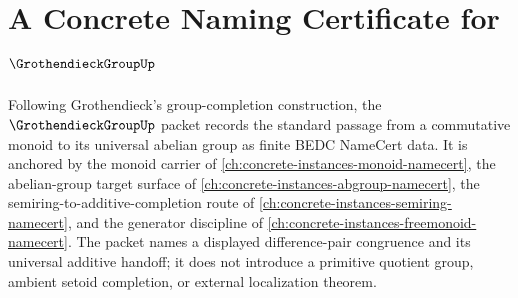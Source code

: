 \chapter{A Concrete Naming Certificate for $\GrothendieckGroupUp$}
\label{ch:concrete-instances-grothendieck-group-namecert}

Following Grothendieck's group-completion construction, the $\GrothendieckGroupUp$ packet records the standard passage from a commutative monoid to its universal abelian group as finite BEDC NameCert data. It is anchored by the monoid carrier of \autoref{ch:concrete-instances-monoid-namecert}, the abelian-group target surface of \autoref{ch:concrete-instances-abgroup-namecert}, the semiring-to-additive-completion route of \autoref{ch:concrete-instances-semiring-namecert}, and the generator discipline of \autoref{ch:concrete-instances-freemonoid-namecert}. The packet names a displayed difference-pair congruence and its universal additive handoff; it does not introduce a primitive quotient group, ambient setoid completion, or external localization theorem.

